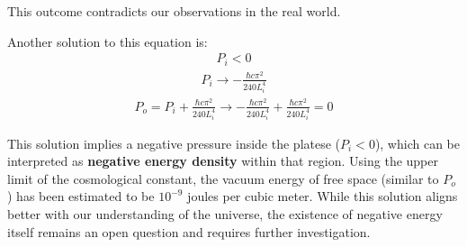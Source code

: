 This outcome contradicts our observations in the real world.

Another solution to this equation is:
\begin{align}P_i < 0\end{align}
\begin{align}P_i \rightarrow -\frac{\hbar c \pi^2}{240 L_i^4}\end{align}
\begin{align}P_o = P_i + \frac{\hbar c \pi^2}{240 L_i^4} \rightarrow -\frac{\hbar c \pi^2}{240 L_i^4} + \frac{\hbar c \pi^2}{240 L_i^4} = 0\end{align}

This solution implies a negative pressure inside the platese ($P_i < 0$), which can be interpreted as \textbf{negative energy density} within that region.
Using the upper limit of the cosmological constant, the vacuum energy of free space (similar to $P_o$) has been estimated to be $10^{-9}$ joules per cubic meter.
While this solution aligns better with our understanding of the universe, 
the existence of negative energy itself remains an open question and requires further investigation.